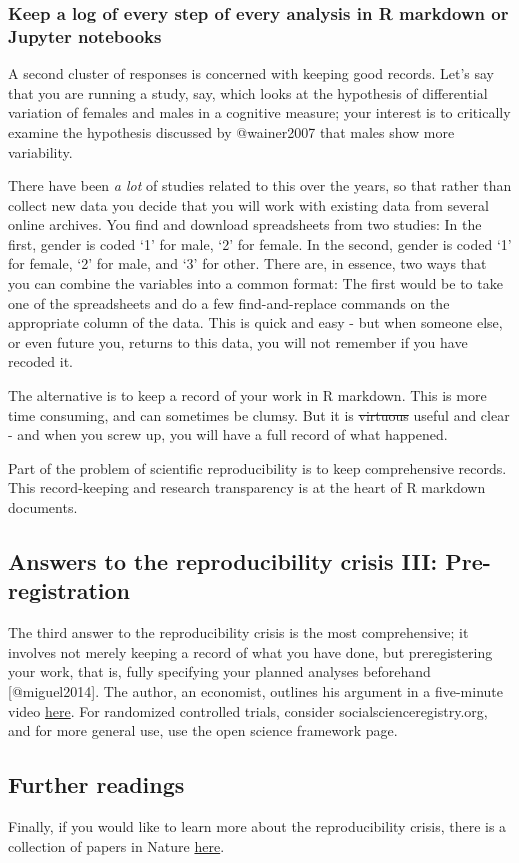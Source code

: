 \documentclass[
]{article}
\begin{document}
\hypertarget{keep-a-log-of-every-step-of-every-analysis-in-r-markdown-or-jupyter-notebooks}{%
\subsubsection{Keep a log of every step of every analysis in R markdown
or Jupyter
notebooks}\label{keep-a-log-of-every-step-of-every-analysis-in-r-markdown-or-jupyter-notebooks}}

A second cluster of responses is concerned with keeping good records.
Let's say that you are running a study, say, which looks at the
hypothesis of differential variation of females and males in a cognitive
measure; your interest is to critically examine the hypothesis discussed
by @wainer2007 that males show more variability.

There have been \emph{a lot} of studies related to this over the years,
so that rather than collect new data you decide that you will work with
existing data from several online archives. You find and download
spreadsheets from two studies: In the first, gender is coded `1' for
male, `2' for female. In the second, gender is coded `1' for female, `2'
for male, and `3' for other. There are, in essence, two ways that you
can combine the variables into a common format: The first would be to
take one of the spreadsheets and do a few find-and-replace commands on
the appropriate column of the data. This is quick and easy - but when
someone else, or even future you, returns to this data, you will not
remember if you have recoded it.

The alternative is to keep a record of your work in R markdown. This is
more time consuming, and can sometimes be clumsy. But it is
\sout{virtuous} useful and clear - and when you screw up, you will have
a full record of what happened.

Part of the problem of scientific reproducibility is to keep
comprehensive records. This record-keeping and research transparency is
at the heart of R markdown documents.

\hypertarget{answers-to-the-reproducibility-crisis-iii-pre-registration}{%
\subsection{Answers to the reproducibility crisis III:
Pre-registration}\label{answers-to-the-reproducibility-crisis-iii-pre-registration}}

The third answer to the reproducibility crisis is the most
comprehensive; it involves not merely keeping a record of what you have
done, but preregistering your work, that is, fully specifying your
planned analyses beforehand {[}@miguel2014{]}. The author, an economist,
outlines his argument in a five-minute video
\href{https://www.futurelearn.com/courses/open-social-science-research/0/steps/31436}{here}.
For randomized controlled trials, consider socialscienceregistry.org,
and for more general use, use the open science framework page.

\hypertarget{further-readings}{%
\subsection{Further readings}\label{further-readings}}

Finally, if you would like to learn more about the reproducibility
crisis, there is a collection of papers in Nature
\href{https://www.nature.com/collections/prbfkwmwvz/}{here}.
\end{document}
